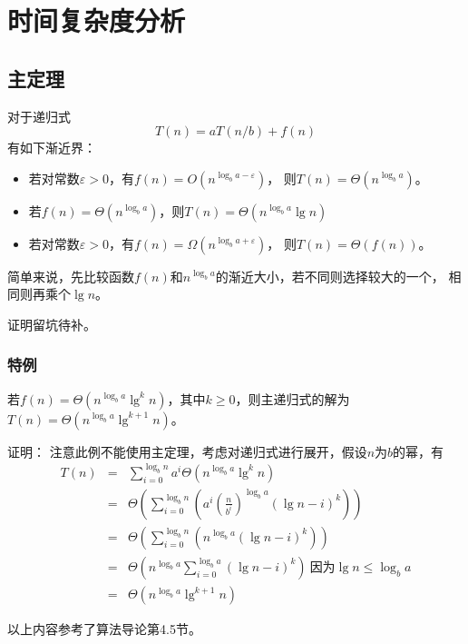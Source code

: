 \section{时间复杂度分析}
\subsection{主定理}
\begin{theorem}
	对于递归式
	\begin{displaymath}
		T(n)=aT(n/b)+f(n)
	\end{displaymath}
	有如下渐近界：
	\begin{itemize}
		\item 若对常数$\varepsilon>0$，有$f(n)=O(n^{\log_b{a-\varepsilon}})$，
		      则$T(n)=\Theta(n^{\log_ba})$。
		\item 若$f(n)=\Theta(n^{\log_ba})$，则$T(n)=\Theta(n^{\log_ba}\lg n)$
		\item 若对常数$\varepsilon>0$，有$f(n)=\Omega(n^{\log_b{a+\varepsilon}})$，
		      则$T(n)=\Theta(f(n))$。
	\end{itemize}
\end{theorem}
简单来说，先比较函数$f(n)$和$n^{\log_ba}$的渐近大小，若不同则选择较大的一个，
相同则再乘个$\lg n$。

证明留坑待补。
\subsubsection{特例}
\begin{theorem}
	若$f(n)=\Theta(n^{\log_ba}\lg^kn)$，其中$k\geq 0$，则主递归式的解为
	$T(n)=\Theta(n^{\log_ba}\lg^{k+1}n)$。
\end{theorem}
证明：
注意此例不能使用主定理，考虑对递归式进行展开，假设$n$为$b$的幂，有
\begin{eqnarray*}
	T(n)&=&\sum_{i=0}^{\log_bn}{a^i\Theta(n^{\log_ba}\lg^kn)}\\
	&=&\Theta\left(\sum_{i=0}^{\log_bn}{\left(a^i\left(\frac{n}{b^i}\right)^
				{\log_b a}(\lg n-i)^k\right)}\right)\\
	&=&\Theta\left(\sum_{i=0}^{\log_bn}{\left(n^{\log_ba}
	(\lg n-i)^k\right)}\right)\\
	&=&\Theta\left(n^{\log_ba}\sum_{i=0}^{\log_ba}{(\lg n-i)^k}\right)
	~\textrm{因为}\lg n\leq \log_ba\\
	&=&\Theta\left(n^{\log_ba}\lg^{k+1}n\right)
\end{eqnarray*}

以上内容参考了算法导论\cite{ITA3}第4.5节。

